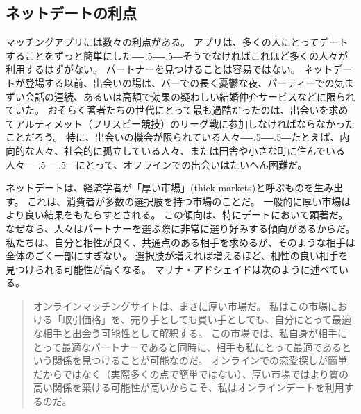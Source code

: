 \documentclass[paper=a4,book,openany]{jlreq}
\def\DDASH{―\kern-.5\zw―\kern-.5\zw―} %
\begin{document}
\subsection{ネットデートの利点}

マッチングアプリには数々の利点がある。
アプリは、多くの人にとってデートすることをずっと簡単にした{\DDASH}そうでなければこれほど多くの人々が利用するはずがない。
パートナーを見つけることは容易ではない。
ネットデートが登場する以前、出会いの場は、バーでの長く憂鬱な夜、パーティーでの気まずい会話の連続、あるいは高額で効果の疑わしい結婚仲介サービスなどに限られていた。
おそらく著者たちの世代にとって最も過酷だったのは、出会いを求めてアルティメット（フリスビー競技）のリーグ戦に参加しなければならなかったことだろう。
特に、出会いの機会が限られている人々{\DDASH}たとえば、内向的な人々、社会的に孤立している人々、または田舎や小さな町に住んでいる人々{\DDASH}にとって、オフラインでの出会いはたいへん困難だ。

ネットデートは、経済学者が「厚い市場」(thick markets)と呼ぶものを生み出す。
これは、消費者が多数の選択肢を持つ市場のことだ。
一般的に厚い市場はより良い結果をもたらすとされる。
この傾向は、特にデートにおいて顕著だ。
なぜなら、人々はパートナーを選ぶ際に非常に選り好みする傾向があるからだ。
私たちは、自分と相性が良く、共通点のある相手を求めるが、そのような相手は全体のごく一部にすぎない。
選択肢が増えれば増えるほど、相性の良い相手を見つけられる可能性が高くなる。
マリナ・アドシェイドは次のように述べている。

\begin{quote}
  オンラインマッチングサイトは、まさに厚い市場だ。
私はこの市場における「取引価格」を、売り手としても買い手としても、自分にとって最適な相手と出会う可能性として解釈する。
この市場では、私自身が相手にとって最適なパートナーであると同時に、相手も私にとって最適であるという関係を見つけることが可能なのだ。
オンラインでの恋愛探しが簡単だからではなく（実際多くの点で簡単ではない）、厚い市場ではより質の高い関係を築ける可能性が高いからこそ、私はオンラインデートを利用するのだ。
\citep[p.8]{adshade13:_dollar_sex}

\end{quote}
\end{document}
